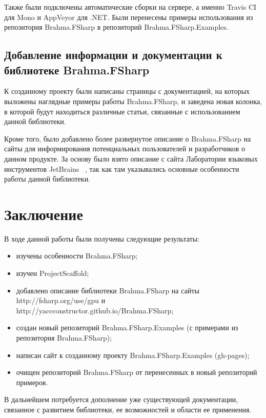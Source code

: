 \documentclass[14pt]{matmex-diploma}
\begin{document}
Также были подключены автоматические сборки на сервере, а именно Travis CI для Mono и AppVeyor для .NET. Были перенесены примеры использования из репозитория  Brahma.FSharp в репозиторий 
    \linebreak Brahma.FSharp.Examples.

\subsection{Добавление информации и документации к \\ библиотеке Brahma.FSharp}


К созданному проекту были написаны страницы с документацией, на которых выложены наглядные примеры работы Brahma.FSharp, и заведена новая колонка, в которой будут находиться различные статьи, связанные с использованием данной библиотеки.

Кроме того, было добавлено более развернутое описание о \linebreak Brahma.FSharp на сайты для информирования потенциальных пользователей и разработчиков о данном продукте. За основу было взято описание с сайта Лаборатории языковых инструментов JetBrains ~\cite{desc}, так как там указывались основные особенности работы данной библиотеки.






\section*{Заключение}
В ходе данной работы были получены следующие результаты:
\begin{itemize}
    \item изучены особенности Brahma.FSharp;
    \item изучен ProjectScaffold;
    \item добавлено описание библиотеки Brahma.FSharp на сайты \linebreak http://fsharp.org/use/gpu и 
          \linebreak http://yaccconstructor.github.io/Brahma.FSharp;
    \item создан новый репозиторий Brahma.FSharp.Examples (с примерами из репозитория Brahma.FSharp);
    \item написан сайт к созданному проекту Brahma.FSharp.Examples  (gh-pages);
    \item очищен репозиторий Brahma.FSharp от перенесенных в новый репозиторий примеров.
\end{itemize}


В дальнейшем потребуется дополнение уже существующей документации, связанное с развитием библиотеки, ее возможностей и области ее применения.


\setmonofont[Mapping=tex-text]{CMU Typewriter Text}


\end{document}
